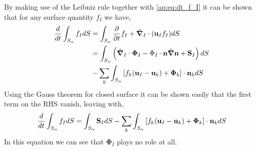 By making use of the Leibniz rule together with \ref{ap:eq:dt_f_I} it can be shown that for any surface quantity $f_I$ we have, 
\begin{align*}
    \frac{d}{d t} \int_{S_\alpha} f_I dS
    &= \int_{S_\alpha} \frac{\partial}{\partial t} f_I 
    + \hat{\bm{\nabla}}_I \cdot (\textbf{u}_If_I) dS\\
    &= \int_{S_\alpha} \left(
        \hat{\bm{\nabla}}_I \cdot \mathbf{\Phi}_I
        - \Phi_I\cdot\textbf{n}\hat{\bm{\nabla}}\textbf{n}
        + \textbf{S}_I
    \right) dS\\
    & - \sum_k \int_{S_\alpha} \left[
        f_k (\textbf{u}_I - \textbf{u}_k)
        + \mathbf{\Phi}_k
    \right] \cdot \textbf{n}_k
    dS
\end{align*}
Using the Gauss theorem for closed surface it can be shown easily that the first term on the RHS vanish, leaving with, 
\begin{align}
    \frac{d}{d t} \int_{S_\alpha} f_I dS
    = \int_{S_\alpha} 
        \textbf{S}_I dS
    - \sum_k \int_{S_\alpha} \left[
        f_k (\textbf{u}_I - \textbf{u}_k)
        + \mathbf{\Phi}_k
    \right] \cdot \textbf{n}_k
    dS
\end{align}
In this equation we can see that $\mathbf{\Phi}_I$ plays no role at all. 

